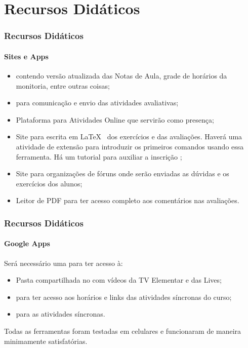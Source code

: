 \section{Recursos Didáticos}


\begin{frame}
    \frametitle{Recursos Didáticos}
    \framesubtitle{Sites e Apps}

    \begin{itemize}
        \item {} contendo versão atualizada das Notas de Aula, grade de horários da monitoria, entre outras coisas; \pause 
        \item {} para comunicação e envio das atividades avaliativas; \pause
        \item Plataforma  para Atividades Online que servirão como presença; \pause
        \item Site  para escrita em \LaTeX~  dos exercícios e das avaliações. Haverá uma atividade de extensão para introduzir os primeiros comandos usando essa ferramenta. Há um tutorial para auxiliar a inscrição ; \pause
        \item Site  para organizações de fóruns onde serão enviadas as dúvidas e os exercícios dos alunos; \pause
        \item Leitor de PDF  para ter acesso completo aos comentários nas avaliações.

    \end{itemize}
\end{frame}

\begin{frame}
    \frametitle{Recursos Didáticos}
    \framesubtitle{Google Apps}
    
    Será necessário uma  para ter acesso à:
        \begin{itemize}
            \item Pasta compartilhada no  com vídeos da TV Elementar e das Lives; \pause
            \item {} para ter acesso aos horários e links das atividades síncronas do curso; \pause
            \item {} para as atividades síncronas.
        \end{itemize}
    
    \begin{observacao*}
        Todas as ferramentas foram testadas em celulares e funcionaram de maneira minimamente satisfatórias.
    \end{observacao*}
    

\end{frame}